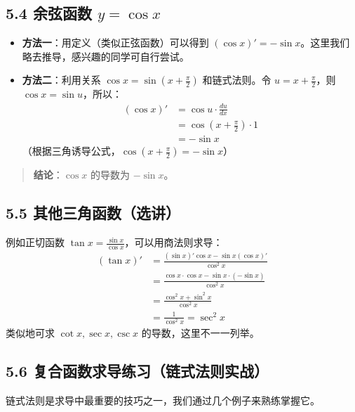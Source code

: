 \documentclass[10pt]{article}
\begin{document}
\subsection*{5.4 余弦函数 $y = \cos x$}
\begin{itemize}
    \item \textbf{方法一}：用定义（类似正弦函数）可以得到 $(\cos x)' = -\sin x$。这里我们略去推导，感兴趣的同学可自行尝试。
    \item \textbf{方法二}：利用关系 $\cos x = \sin\left(x + \frac{\pi}{2}\right)$ 和链式法则。令 $u = x + \frac{\pi}{2}$，则 $\cos x = \sin u$，所以：
    \[
    \begin{aligned}
    (\cos x)' &= \cos u \cdot \frac{du}{dx} \\
    &= \cos\left(x + \frac{\pi}{2}\right) \cdot 1 \\
    &= -\sin x
    \end{aligned}
    \]
    （根据三角诱导公式，$\cos\left(x + \frac{\pi}{2}\right) = -\sin x$）
\end{itemize}

\begin{quote}
\textbf{结论}：$\cos x$ 的导数为 $-\sin x$。
\end{quote}

\subsection*{5.5 其他三角函数（选讲）}
例如正切函数 $\tan x = \frac{\sin x}{\cos x}$，可以用商法则求导：
\[
\begin{aligned}
(\tan x)' &= \frac{(\sin x)' \cos x - \sin x (\cos x)'}{\cos^2 x} \\
&= \frac{\cos x \cdot \cos x - \sin x \cdot (-\sin x)}{\cos^2 x} \\
&= \frac{\cos^2 x + \sin^2 x}{\cos^2 x} \\
&= \frac{1}{\cos^2 x} = \sec^2 x
\end{aligned}
\]
类似地可求 $\cot x, \sec x, \csc x$ 的导数，这里不一一列举。

\subsection*{5.6 复合函数求导练习（链式法则实战）}
链式法则是求导中最重要的技巧之一，我们通过几个例子来熟练掌握它。
\end{document}

